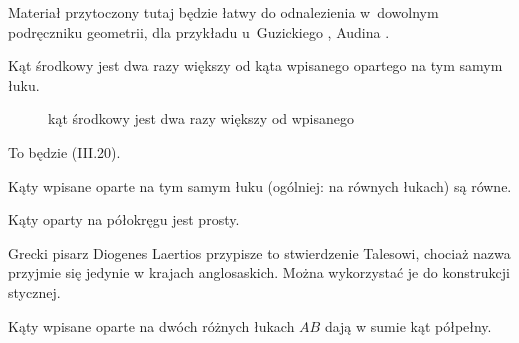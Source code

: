 
Materiał przytoczony tutaj będzie łatwy do odnalezienia w~dowolnym podręczniku geometrii, dla przykładu u~Guzickiego \cite[s. 11-13, 18, 19]{guzicki_2021}, Audina \cite[s. 74, 75]{audin_2003}.

\begin{proposition}
%
%
    Kąt środkowy jest dwa razy większy od kąta wpisanego opartego na tym samym łuku.
\begin{figure}[H]\centering%
\begin{comment}
\begin{tikzpicture}[scale=.35]
    \tkzDefPoint(0, 0){Zero}
    \tkzDefPoint(100:5){A}
    \tkzDefPoint(100:3.5){Aa}
    \tkzDefPoint(230:5){B}
    \tkzDefPoint(285:1.5){Oo}
    \tkzDefPoint(340:5){C}
    \tkzDrawCircle[line width=0.5mm](Zero,A)
    \tkzLabelPoint[above left](Zero){$O$}
    \tkzLabelPoint[above](A){$A$}
    \tkzLabelPoint[below left](B){$B$}
    \tkzLabelPoint[below right](C){$C$}
    \tkzDrawPolygons[line width=0.3mm](A,B,Zero,C)
    \tkzMarkAngle(B,Zero,C)
    \tkzMarkAngle(B,A,C)
    \tkzDrawPoints[size=3,color=black,fill=red!50](A,B,C,Zero)
    \tkzLabelPoint[anchor=center](Aa){$\alpha$}
    \tkzLabelPoint[anchor=center](Oo){$2\alpha$}
\end{tikzpicture}
\end{comment}
    \caption{kąt środkowy jest dwa razy większy od wpisanego}
\end{figure}
\end{proposition}

To będzie (III.20).

\begin{corollary}
    Kąty wpisane oparte na tym samym łuku (ogólniej: na równych łukach) są równe.
\end{corollary}

\begin{corollary}
    Kąty oparty na półokręgu jest prosty.
\end{corollary}

Grecki pisarz Diogenes Laertios przypisze to stwierdzenie Talesowi, chociaż nazwa przyjmie się jedynie w krajach anglosaskich.
%
%
Można wykorzystać je do konstrukcji stycznej.
%

\begin{corollary}
    \label{ab_twice_pi}
    Kąty wpisane oparte na dwóch różnych łukach $AB$ dają w sumie kąt półpełny.
\end{corollary}

